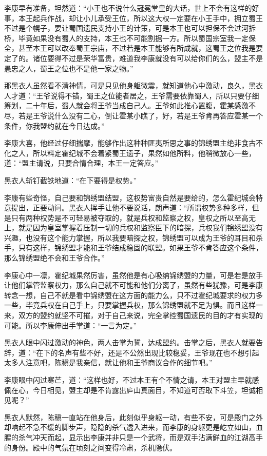 李康早有准备，坦然道：“小王也不说什么冠冕堂皇的大话，世上不会有这样的好事，本王起兵作战，却让小儿承受王位，所以这大权一定要在小王手中，拥立蜀王不过是个幌子，要让蜀国遗民支持小王的计策，可是本王也可以担保不会过河拆桥，毕竟如果没有蜀人的支持，本王也不可能割据一方。所以蜀国宗室我一定保全，甚至本王可以改奉蜀王宗庙，不过若是本王能够有所成就，这蜀王之位我是要定了的。诸位要得不过是荣华富贵，难道我李康就没有可以给你们的么，盟主不是愚忠之人，蜀王之位也不是他一家之物。”

那黑衣人虽然看不清神情，可是只见他身躯微震，就知道他心中激动，良久，黑衣人才道：“王爷说得不错，蜀王之位能者居之，王爷需要依靠蜀人，所以只要仔细筹划，二十年后，蜀人就会将王爷当成自己人。王爷如此推心置腹，霍某感激不尽，若是王爷说什么没有二心，倒让霍某小瞧了，好，若是王爷肯再答应霍某一个条件，你我盟约就在今日达成。”

李康大喜，他经过仔细揣摩，能够作出这种种匪夷所思之事的锦绣盟主绝非食古不化之人，所以料定霍纪城不会着紧蜀王遗子，果然如他所料，他稍微放心一些，道：“盟主请说，只要合情合理，本王一定答应。”

黑衣人斩钉截铁地道：“在下要得是权势。”

李康有些奇怪，自己要和锦绣盟结盟，这权势富贵自然是要给的，怎么霍纪城会特意提出，正要动问。黑衣人挥手让他不要说话，朗声道：“所谓权势多种多样，但是只有两种权势是不可轻易被夺取的，就是兵权和监察之权，皇权之所以至高无上，就是因为皇室掌握着压制一切的兵权和监察臣下的暗探，兵权我们锦绣盟没有兴趣，也没有这个能力掌握，所以我要暗探之权，锦绣盟可以成为王爷的耳目和杀手，只有这样，锦绣盟才能和王爷结成稳固的联盟。如果王爷不肯答应这个条件，那么锦绣盟绝不会和王爷合作。”

李康心中一凛，霍纪城果然厉害，虽然他是有心吸纳锦绣盟的力量，可是若是放手让他们掌管监察权力，那么自己就不可能和他们分离了，虽然有些犹豫，可是李康转念一想，自己不就是看中锦绣盟在这方面的能力么，只不过霍纪城要求的权力多一些，毕竟兵权在自己手上，只要掌握兵权，那么锦绣盟就不足为惧。而且这样一来，双方的盟约就坚不可摧，对于自己来说，完全掌控蜀国遗民的目的才有实现的可能。所以李康伸出手掌道：“一言为定。”

黑衣人眼中闪过激动的神色，两人击掌为誓，达成盟约。击掌之后，黑衣人就要告辞，道：“在下的名声有些不好，还是不公然出现比较稳妥，王爷现在也不想引起太多人注意吧，陈稹是我亲信，就让他和王爷商议合作的细节吧。”

李康眼中闪过寒芒，道：“这样也好，不过本王有个不情之请，本王对盟主早就感佩在心，今日相见，盟主却是不肯露出庐山真面目，不知道可否取下斗笠，坦诚相见呢？”

黑衣人默然，陈稹一直站在他身后，此刻似乎身躯一动，有些不安，可是殿门之外却响起不急不缓的脚步声，隐隐的杀气透入进来，而李康的身躯更是屹立如山，血腥的杀气冲天而起，显示出李康并非只是一个武将，而是双手沾满鲜血的江湖高手的身份。殿中的气氛在顷刻之间变得冷肃，杀机隐伏。

